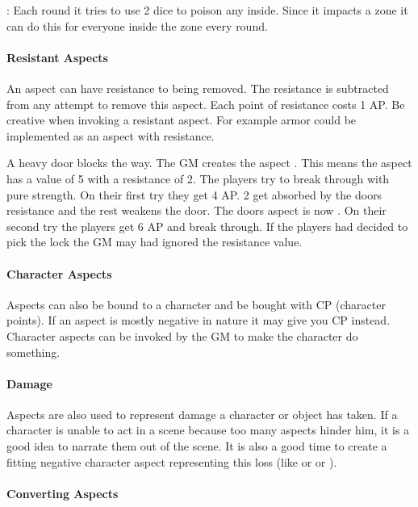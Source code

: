 \documentclass[11pt]{article}
\begin{document}
{\begin{pwexample}
: Each round it tries to use 2 dice to poison any inside. Since it impacts a zone it can do this for everyone inside the zone every round.
\end{pwexample}
\paragraph*{Resistant Aspects}
\label{sec:org73f5544}
An aspect can have resistance to being removed. The resistance is subtracted from any attempt to remove this aspect. Each point of resistance costs 1 AP. Be creative when invoking a resistant aspect. For example armor could be implemented as an aspect with resistance.

\begin{pwexample}
A heavy door blocks the way. The GM creates the aspect . This means the aspect has a value of 5 with a resistance of 2. The players try to break through with pure strength. On their first try they get 4 AP. 2 get absorbed by the doors resistance and the rest weakens the door. The doors aspect is now . On their second try the players get 6 AP and break through.
If the players had decided to pick the lock the GM may had ignored the resistance value.
\end{pwexample}
\paragraph*{Character Aspects}
\label{sec:orgcc9581d}

Aspects can also be bound to a character and be bought with CP (character points). If an aspect is mostly negative in nature it may give you CP instead. Character aspects can be invoked by the GM to make the character do something. 
\paragraph*{Damage}
\label{sec:org25bebce}

Aspects are also used to represent damage a character or object has taken. If a character is unable to act in a scene because too many aspects hinder him, it is a good idea to narrate them out of the scene. It is also a good time to create a fitting negative character aspect representing this loss (like  or  or ).
\paragraph*{Converting Aspects}
\label{sec:org58ae9ae}

}
\end{document}
